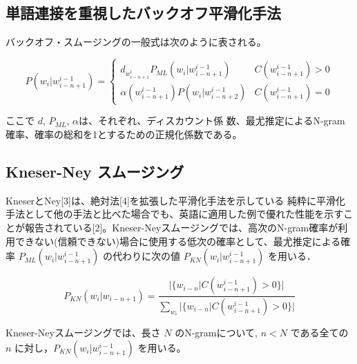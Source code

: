 \subsection{単語連接を重視したバックオフ平滑化手法}
バックオフ・スムージングの一般式は次のように表される。

\begin{equation}
		P(w_i|w_{i-n+1}^{i-1}) = 
    \begin{cases} 
        d_{w_{i-n+1}^i} P_{ML}(w_i|w_{i-n+1}^{i-1}) & C(w_{i-n+1}^{i-1}) > 0\\ 
        \alpha(w_{i-n+1}^{i-1})P(w_i|w_{i-n+2}^{i-1}) & C(w_{i-n+1}^{i-1}) = 0
    \end{cases} 
    \label{ngram_smoosing1}
\end{equation}

ここで $d$, $P_{ML}$, $\alpha$は、それぞれ、ディスカウント係
数、最尤推定によるN-gram確率、確率の総和を1とするための正規化係数である。

\subsection{Kneser-Ney スムージング}
KneserとNey[3]は、絶対法[4]を拡張した平滑化手法を示している
純粋に平滑化手法として他の手法と比べた場合でも、英語に適用した例で優れた性能を示すことが報告されている[2]。Kneser-Neyスムージングでは、高次のN-gram確率が利用できない(信頼できない)場合に使用する低次の確率として、最尤推定による確率 $P_{ML} (w_i|w_{i-n+1}^{i-1})$ の代わりに次の値 $P_{KN} (w_i|w_{i-n+1}^{i-1})$ を用いる．

\begin{equation}
		P_{KN} (w_i|w_{i-n+1}) = \frac{|\{w_{i-n}|C(w_{i-n+1}^{i-1}) > 0\}|}{\sum_{w_i} |\{w_{i-n}|C(w_{i-n+1}^{i-1}) > 0\}|} 
    \label{ngram_smoosing2}
\end{equation}

Kneser-Neyスムージングでは、長さ $N$ のN-gramについて, $n  <  N$ である全ての $n$ に対し，$P_{KN} (w_i|w_{i-n+1}^{i-1})$ を用いる。
